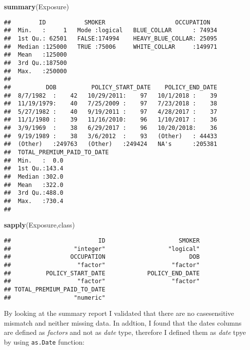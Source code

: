 \documentclass[]{article}
\newenvironment{Shaded}{\begin{snugshade}}{\end{snugshade}}
\newcommand{\KeywordTok}[1]{\textcolor[rgb]{0.13,0.29,0.53}{\textbf{#1}}}
\newcommand{\NormalTok}[1]{#1}
\begin{document}
\begin{Shaded}
\begin{Highlighting}[]
\KeywordTok{summary}\NormalTok{(Exposure)}
\end{Highlighting}
\end{Shaded}

\begin{verbatim}
##        ID           SMOKER                    OCCUPATION    
##  Min.   :     1   Mode :logical   BLUE_COLLAR      : 74934  
##  1st Qu.: 62501   FALSE:174994    HEAVY_BLUE_COLLAR: 25095  
##  Median :125000   TRUE :75006     WHITE_COLLAR     :149971  
##  Mean   :125000                                             
##  3rd Qu.:187500                                             
##  Max.   :250000                                             
##                                                             
##          DOB          POLICY_START_DATE    POLICY_END_DATE  
##  8/7/1982  :    42   10/29/2011:    97   10/1/2018 :    39  
##  11/19/1979:    40   7/25/2009 :    97   7/23/2018 :    38  
##  5/27/1982 :    40   9/19/2011 :    97   4/28/2017 :    37  
##  11/1/1980 :    39   11/16/2010:    96   1/10/2017 :    36  
##  3/9/1969  :    38   6/29/2017 :    96   10/20/2018:    36  
##  9/19/1989 :    38   3/6/2012  :    93   (Other)   : 44433  
##  (Other)   :249763   (Other)   :249424   NA's      :205381  
##  TOTAL_PREMIUM_PAID_TO_DATE
##  Min.   :  0.0             
##  1st Qu.:143.4             
##  Median :302.0             
##  Mean   :322.0             
##  3rd Qu.:488.0             
##  Max.   :730.4             
## 
\end{verbatim}

\begin{Shaded}
\begin{Highlighting}[]
\KeywordTok{sapply}\NormalTok{(Exposure,class)}
\end{Highlighting}
\end{Shaded}

\begin{verbatim}
##                         ID                     SMOKER 
##                  "integer"                  "logical" 
##                 OCCUPATION                        DOB 
##                   "factor"                   "factor" 
##          POLICY_START_DATE            POLICY_END_DATE 
##                   "factor"                   "factor" 
## TOTAL_PREMIUM_PAID_TO_DATE 
##                  "numeric"
\end{verbatim}

By looking at the summary report I validated that there are no
casesensitive mismatch and neither missing data. In addtion, I found
that the dates columns are defined as \emph{factors} and not as
\emph{date} type, therefore I defined them as \emph{date} tpye by using
\texttt{as.Date} function:
\end{document}
